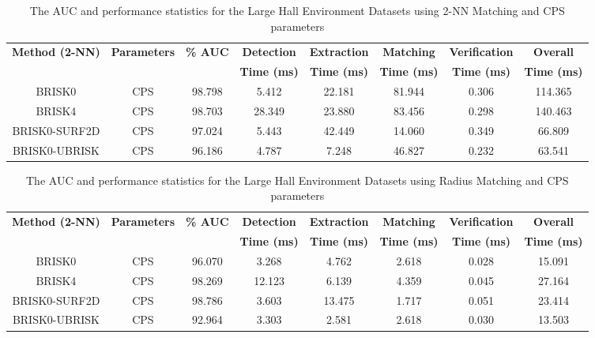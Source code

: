 \documentclass[11pt]{report}
\begin{document}
\begin{table}
\caption{The AUC and performance statistics for the Large Hall Environment
Datasets using 2-NN Matching and CPS parameters}
\begin{tabular}{|c|c|c|c|c|c|c|c|}
\hline 
\textbf{Method (2-NN)} & \textbf{Parameters} & \textbf{\% AUC} & \textbf{Detection} & \textbf{Extraction} & \textbf{Matching} & \textbf{Verification} & \textbf{Overall}\tabularnewline
 &  &  & \textbf{Time (ms)} & \textbf{Time (ms)} & \textbf{Time (ms)} & \textbf{Time (ms)} & \textbf{Time (ms)}\tabularnewline
\hline 
\hline 
BRISK0 & CPS & 98.798 & 5.412 & 22.181 & 81.944 & 0.306 & 114.365\tabularnewline
\hline 
BRISK4 & CPS & 98.703 & 28.349 & 23.880 & 83.456 & 0.298 & 140.463\tabularnewline
\hline 
BRISK0-SURF2D & CPS & 97.024 & 5.443 & 42.449 & 14.060 & 0.349 & 66.809\tabularnewline
\hline 
BRISK0-UBRISK & CPS & 96.186 & 4.787 & 7.248 & 46.827 & 0.232 & 63.541\tabularnewline
\hline 
\end{tabular}
\label{app:lh_hamming}
\end{table}


\begin{table}
\caption{The AUC and performance statistics for the Large Hall Environment
Datasets using Radius Matching and CPS parameters}
\begin{tabular}{|c|c|c|c|c|c|c|c|}
\hline 
\textbf{Method (2-NN)} & \textbf{Parameters} & \textbf{\% AUC} & \textbf{Detection} & \textbf{Extraction} & \textbf{Matching} & \textbf{Verification} & \textbf{Overall}\tabularnewline
 &  &  & \textbf{Time (ms)} & \textbf{Time (ms)} & \textbf{Time (ms)} & \textbf{Time (ms)} & \textbf{Time (ms)}\tabularnewline
\hline 
\hline 
BRISK0 & CPS & 96.070 & 3.268 & 4.762 & 2.618 & 0.028 & 15.091\tabularnewline
\hline 
BRISK4 & CPS & 98.269 & 12.123 & 6.139 & 4.359 & 0.045 & 27.164\tabularnewline
\hline 
BRISK0-SURF2D & CPS & 98.786 & 3.603 & 13.475 & 1.717 & 0.051 & 23.414\tabularnewline
\hline 
BRISK0-UBRISK & CPS & 92.964 & 3.303 & 2.581 & 2.618 & 0.030 & 13.503\tabularnewline
\hline 
\end{tabular}
\label{app:lh_hamming}
\end{table}
\end{document}
